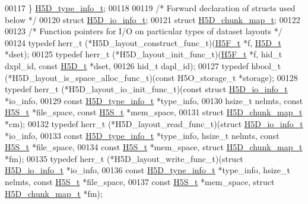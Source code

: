 \begin{DoxyCode}
00117 \} \hyperlink{struct_h5_d__type__info__t}{H5D\_type\_info\_t};
00118 
00119 \textcolor{comment}{/* Forward declaration of structs used below */}
00120 \textcolor{keyword}{struct }\hyperlink{struct_h5_d__io__info__t}{H5D\_io\_info\_t};
00121 \textcolor{keyword}{struct }\hyperlink{struct_h5_d__chunk__map__t}{H5D\_chunk\_map\_t};
00122 
00123 \textcolor{comment}{/* Function pointers for I/O on particular types of dataset layouts */}
00124 \textcolor{keyword}{typedef} herr\_t (*H5D\_layout\_construct\_func\_t)(\hyperlink{struct_h5_f__t}{H5F\_t} *f, \hyperlink{struct_h5_d__t}{H5D\_t} *dset);
00125 \textcolor{keyword}{typedef} herr\_t (*H5D\_layout\_init\_func\_t)(\hyperlink{struct_h5_f__t}{H5F\_t} *f, hid\_t dxpl\_id, \textcolor{keyword}{const} 
      \hyperlink{struct_h5_d__t}{H5D\_t} *dset,
00126     hid\_t dapl\_id);
00127 \textcolor{keyword}{typedef} hbool\_t (*H5D\_layout\_is\_space\_alloc\_func\_t)(\textcolor{keyword}{const} H5O\_storage\_t *storage);
00128 \textcolor{keyword}{typedef} herr\_t (*H5D\_layout\_io\_init\_func\_t)(\textcolor{keyword}{const} \textcolor{keyword}{struct }\hyperlink{struct_h5_d__io__info__t}{H5D\_io\_info\_t} *io\_info,
00129     \textcolor{keyword}{const} \hyperlink{struct_h5_d__type__info__t}{H5D\_type\_info\_t} *type\_info,
00130     hsize\_t nelmts, \textcolor{keyword}{const} \hyperlink{struct_h5_s__t}{H5S\_t} *file\_space, \textcolor{keyword}{const} \hyperlink{struct_h5_s__t}{H5S\_t} *mem\_space,
00131     \textcolor{keyword}{struct }\hyperlink{struct_h5_d__chunk__map__t}{H5D\_chunk\_map\_t} *cm);
00132 \textcolor{keyword}{typedef} herr\_t (*H5D\_layout\_read\_func\_t)(\textcolor{keyword}{struct }\hyperlink{struct_h5_d__io__info__t}{H5D\_io\_info\_t} *io\_info,
00133     \textcolor{keyword}{const} \hyperlink{struct_h5_d__type__info__t}{H5D\_type\_info\_t} *type\_info, hsize\_t nelmts, \textcolor{keyword}{const} \hyperlink{struct_h5_s__t}{H5S\_t} *file\_space,
00134     \textcolor{keyword}{const} \hyperlink{struct_h5_s__t}{H5S\_t} *mem\_space, \textcolor{keyword}{struct }\hyperlink{struct_h5_d__chunk__map__t}{H5D\_chunk\_map\_t} *fm);
00135 \textcolor{keyword}{typedef} herr\_t (*H5D\_layout\_write\_func\_t)(\textcolor{keyword}{struct }\hyperlink{struct_h5_d__io__info__t}{H5D\_io\_info\_t} *io\_info,
00136     \textcolor{keyword}{const} \hyperlink{struct_h5_d__type__info__t}{H5D\_type\_info\_t} *type\_info, hsize\_t nelmts, \textcolor{keyword}{const} \hyperlink{struct_h5_s__t}{H5S\_t} *file\_space,
00137     \textcolor{keyword}{const} \hyperlink{struct_h5_s__t}{H5S\_t} *mem\_space, \textcolor{keyword}{struct }\hyperlink{struct_h5_d__chunk__map__t}{H5D\_chunk\_map\_t} *fm);

\end{DoxyCode}
